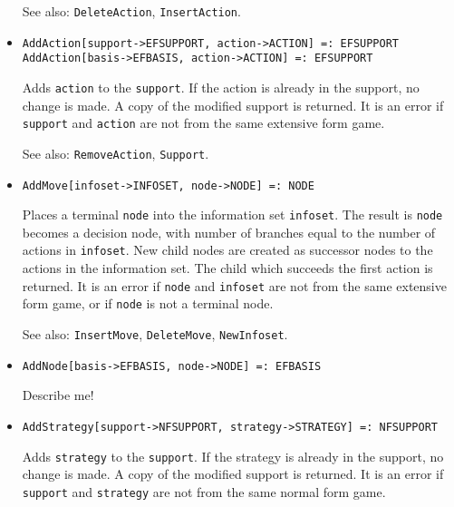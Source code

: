 \begin{itemize}
\item [See also:] \verb+DeleteAction+, \verb+InsertAction+.
\ed

\item{}
\protect \large \begin{verbatim} 
AddAction[support->EFSUPPORT, action->ACTION] =: EFSUPPORT 
AddAction[basis->EFBASIS, action->ACTION] =: EFSUPPORT 
\end{verbatim}\normalsize

\bd 
Adds \verb+action+ to the \verb+support+.  If the action is already in
the support, no change is made.  A copy of the modified support is
returned.  It is an error if \verb+support+ and \verb+action+ are not from the
same extensive form game.

\item [See also:] \verb+RemoveAction+, \verb+Support+.
\ed

\item{}
\protect \large \begin{verbatim} 
AddMove[infoset->INFOSET, node->NODE] =: NODE 
\end{verbatim}\normalsize

\bd
Places a terminal \verb+node+ into the information set
\verb+infoset+.  The result is \verb+node+ becomes a decision node,
with number of branches equal to the number of actions in \verb+infoset+.
New child nodes are created as successor nodes to the actions in the
information set.  The child which succeeds the first action is returned.
It is an error if \verb+node+ and \verb+infoset+ are not from the same
extensive form game, or if \verb+node+ is not a terminal node.

\item [See also:] \verb+InsertMove+, \verb+DeleteMove+,
\verb+NewInfoset+.  
\ed

\item{}
\protect \large \begin{verbatim}
AddNode[basis->EFBASIS, node->NODE] =: EFBASIS
\end{verbatim}\normalsize

\bd
Describe me!
\ed

\item{}
\protect \large \begin{verbatim}
AddStrategy[support->NFSUPPORT, strategy->STRATEGY] =: NFSUPPORT 
\end{verbatim}\normalsize

\bd
Adds \verb+strategy+ to the \verb+support+.  If the strategy is already
in the support, no change is made.  A copy of the modified support is
returned.  It is an error if \verb+support+ and \verb+strategy+ are not
from the same normal form game.


\end{itemize}
